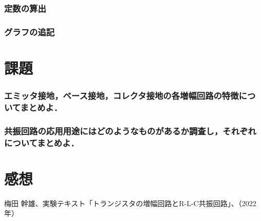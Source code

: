 \documentclass[dvipdfmx,titlepage,a4j]{jsarticle}  %
\begin{document}
\subsubsection{定数の算出}

\subsubsection{グラフの追記}

\section{課題}

\subsubsection{エミッタ接地，ベース接地，コレクタ接地の各増幅回路の特徴についてまとめよ．}

\subsubsection{共振回路の応用用途にはどのようなものがあるか調査し，それぞれについてまとめよ．}

\section{感想}

\begin{thebibliography}{99}
   梅田 幹雄、実験テキスト「トランジスタの増幅回路とR-L-C共振回路」、（2022年）
\end{thebibliography}
\end{document}
